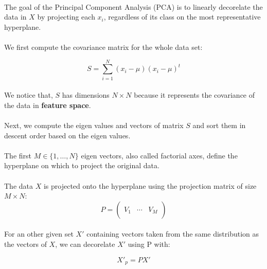 
\paragraph{}
The goal of the Principal Component Analysis (PCA) is to linearly decorelate the data in $X$ by projecting each $x_i$, regardless of its class on the most representative hyperplane.

\paragraph{}
We first compute the covariance matrix for the whole data set:

$$ S = \sum_{i = 1}^N (x_i - \mu)(x_i - \mu)^t $$

\paragraph{}
We notice that, $S$ has dimensions $N \times N$ because it represents the covariance of the data in \textbf{feature space}.

\paragraph{}
Next, we compute the eigen values and vectors of matrix $S$ and sort them in descent order based on the eigen values.

\paragraph{}
The first $M \in \{1, \ldots, N\}$ eigen vectors, also called factorial axes, define the hyperplane on which to project the original data.

\paragraph{}
The data $X$ is projected onto the hyperplane using the projection matrix of size $M \times N$:
$$ P = \left( \begin{array}{ccc}
 &  &  \\
V_1 & \cdots & V_M \\
 &  &  \end{array} \right) $$ 

\paragraph{}
For an other given set $X'$ containing vectors taken from the same distribution as the vectors of $X$, we can decorelate $X'$ using P with:

$$ X'_p = PX'$$
